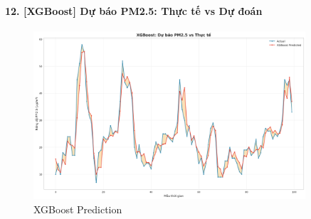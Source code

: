 \documentclass[12pt,a4paper]{article}
\begin{document}
\paragraph{12. [XGBoost] Dự báo PM2.5: Thực tế vs Dự đoán}

\begin{figure}[H]
\centering
\includegraphics[width=0.9\textwidth]{results_comb_PM25_Hanoi_2018_sm_20251011_121424/20251011_121424_xgb_predicted_vs_actual.png}
\caption{XGBoost Prediction}
\end{figure}
\end{document}
